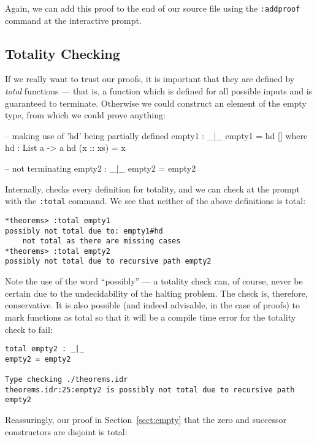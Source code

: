 \noindent
Again, we can add this proof to the end of our source file using the \texttt{:addproof} command at the interactive prompt.

\subsection{Totality Checking}
\label{sect:totality}

If we really want to trust our proofs, it is important that they are defined by \emph{total} functions --- that is, a function which is defined for all possible inputs and is guaranteed to terminate.
Otherwise we could construct an element of the empty type, from which we could prove anything:

\begin{code}
-- making use of 'hd' being partially defined
empty1 : _|_
empty1 = hd [] where
    hd : List a -> a
    hd (x :: xs) = x

-- not terminating
empty2 : _|_
empty2 = empty2
\end{code} 

\noindent
Internally, \Idris{} checks every definition for totality, and we can check at the prompt with the \texttt{:total} command.
We see that neither of the above definitions is total:

\begin{lstlisting}[style=stdout]
*theorems> :total empty1
possibly not total due to: empty1#hd
	not total as there are missing cases
*theorems> :total empty2
possibly not total due to recursive path empty2
\end{lstlisting} 

\noindent
Note the use of the word ``possibly'' --- a totality check can, of course, never be certain due to the undecidability of the halting problem.
The check is, therefore, conservative.
It is also possible (and indeed advisable, in the case of proofs) to mark functions as total so that it will be a compile time error for the totality check to fail:

\begin{lstlisting}[style=stdout]
total empty2 : _|_
empty2 = empty2

Type checking ./theorems.idr
theorems.idr:25:empty2 is possibly not total due to recursive path empty2 
\end{lstlisting} 

\noindent
Reassuringly, our proof in Section~\ref{sect:empty} that the zero and successor constructors are disjoint is total:


